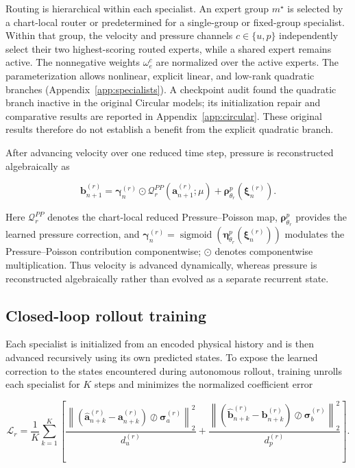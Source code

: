 \documentclass{article}
\begin{document}
Routing is hierarchical within each specialist. An expert group $m^\star$ is selected by a chart-local router or predetermined for a single-group or fixed-group specialist. Within that group, the velocity and pressure channels $c\in\{u,p\}$ independently select their two highest-scoring routed experts, while a shared expert remains active. The nonnegative weights $\omega_e^c$ are normalized over the active experts. The parameterization allows nonlinear, explicit linear, and low-rank quadratic branches (Appendix~\ref{app:specialists}). A checkpoint audit found the quadratic branch inactive in the original Circular models; its initialization repair and comparative results are reported in Appendix~\ref{app:circular}. These original results therefore do not establish a benefit from the explicit quadratic branch.

After advancing velocity over one reduced time step, pressure is reconstructed algebraically as


\begin{equation}
  \bm b_{n+1}^{(r)}
  =\bm\gamma_n^{(r)}\odot\mathcal Q_r^{PP}(\bm a_{n+1}^{(r)};\mu)
  +\bm\rho^p_{\theta_r}(\bm\xi_n^{(r)}).
  \label{eq:main_pressure_closure}
\end{equation}


Here $\mathcal Q_r^{PP}$ denotes the chart-local reduced Pressure--Poisson map, $\bm\rho^p_{\theta_r}$ provides the learned pressure correction, and $\bm\gamma_n^{(r)} =\operatorname{sigmoid}(\bm\eta^p_{\theta_r}(\bm\xi_n^{(r)}))$ modulates the Pressure--Poisson contribution componentwise; $\odot$ denotes componentwise multiplication. Thus velocity is advanced dynamically, whereas pressure is reconstructed algebraically rather than evolved as a separate recurrent state.


\subsection{Closed-loop rollout training}

Each specialist is initialized from an encoded physical history and is then advanced recursively using its own predicted states. To expose the learned correction to the states encountered during autonomous rollout, training unrolls each specialist for $K$ steps and minimizes the
normalized coefficient error


\begin{equation}
  \mathcal L_r=\frac{1}{K}\sum_{k=1}^{K}\left[
  \frac{\left\|(\widehat{\bm a}_{n+k}^{(r)}-\bm a_{n+k}^{(r)})
  \oslash\bm\sigma_a^{(r)}\right\|_2^2}{d_u^{(r)}}
  +\frac{\left\|(\widehat{\bm b}_{n+k}^{(r)}-\bm b_{n+k}^{(r)})
  \oslash\bm\sigma_b^{(r)}\right\|_2^2}{d_p^{(r)}}\right].
  \label{eq:main_rollout_loss}
\end{equation}
\end{document}
